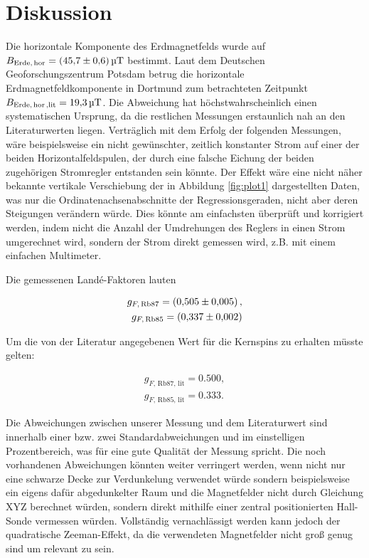 \section{Diskussion}
\label{sec:Diskussion}

Die horizontale Komponente des Erdmagnetfelds wurde auf $B_\text{Erde,\,hor} = \SI{45.7\pm 0.6}{\micro \tesla}$ bestimmt. Laut dem Deutschen Geoforschungszentrum Potsdam \cite{mag} betrug die horizontale Erdmagnetfeldkomponente in Dortmund zum betrachteten Zeitpunkt $B_\text{Erde,\,hor\,,lit} = \SI{19.3}{\micro \tesla}$. Die Abweichung hat höchstwahrscheinlich einen systematischen Ursprung, da die restlichen Messungen erstaunlich nah an den Literaturwerten liegen. Verträglich mit dem Erfolg der folgenden Messungen, wäre beispielsweise ein nicht gewünschter, zeitlich konstanter Strom auf einer der beiden Horizontalfeldspulen, der durch eine falsche Eichung der beiden zugehörigen Stromregler entstanden sein könnte. Der Effekt wäre eine nicht näher bekannte vertikale Verschiebung der in Abbildung \ref{fig:plot1} dargestellten Daten, was nur die Ordinatenachsenabschnitte der Regressionsgeraden, nicht aber deren Steigungen verändern würde. Dies könnte am einfachsten überprüft und korrigiert werden, indem nicht die Anzahl der Umdrehungen des Reglers in einen Strom umgerechnet wird, sondern der Strom direkt gemessen wird, z.B. mit einem einfachen Multimeter.

Die gemessenen Landé-Faktoren lauten

\begin{eqnarray}
	g_{F,\, \text{Rb}87} = \SI{0.505 \pm 0.005},\\
	g_{F,\, \text{Rb}85} = \SI{0.337 \pm 0.002}.
\end{eqnarray}

Um die von der Literatur \cite{Rb} angegebenen Wert für die Kernspins zu erhalten müsste gelten:

\begin{eqnarray}
g_{F,\, \text{Rb}87, \, \text{lit}} = \SI{0.500},\\
g_{F,\, \text{Rb}85, \, \text{lit}} = \SI{0.333}.
\end{eqnarray}

Die Abweichungen zwischen unserer Messung und dem Literaturwert sind innerhalb einer bzw. zwei Standardabweichungen und im einstelligen Prozentbereich, was für eine gute Qualität der Messung spricht. Die noch vorhandenen Abweichungen könnten weiter verringert werden, wenn nicht nur eine schwarze Decke zur Verdunkelung verwendet würde sondern beispielsweise ein eigens dafür abgedunkelter Raum und die Magnetfelder nicht durch Gleichung XYZ berechnet würden, sondern direkt mithilfe einer zentral positionierten Hall-Sonde vermessen würden. Vollständig vernachlässigt werden kann jedoch der quadratische Zeeman-Effekt, da die verwendeten Magnetfelder nicht groß genug sind um relevant zu sein. 

